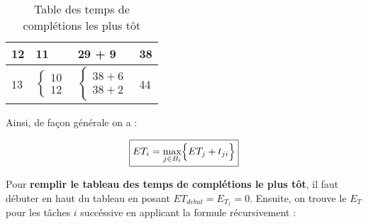 \documentclass{report}
\begin{document}
\begin{multicols*}{2}
\begin{table}[H]
\begin{center}
\begin{tabular}{|l|l|l|l|}
            12 & 11 & 29 + 9 & 38 
            \\ 
            \hline            
            13 & \hspace{-1.1em}
            $\begin{cases}
                10 \\
                12 
            \end{cases}$
               & 
               \hspace{-1.1em}
               $\begin{cases}
                   38 + 6 \\ 
                   38 + 2 
               \end{cases}$ 
               & 44
               \\ 
               \hline
        \end{tabular}
    \end{center}
    \caption {Table des temps de complétions les plus tôt}
\end{table}

Ainsi, de façon générale on a :

\begin{align*}
    \boxed{
        ET_i = \max_{j \in B_i}\Bigl\{ ET_j + t_{ji} \Bigr\}
    }
\end{align*}


Pour \textbf{remplir le tableau des temps de complétions le plus tôt}, 
il faut débuter en haut du tableau en posant 
$ET_{debut} = E_{T_1} = 0$. Ensuite, on trouve le $E_T$ 
pour les tâches $i$ succéssive en applicant la formule récursivement :


\end{multicols*}
\end{document}
